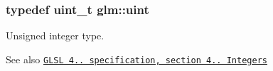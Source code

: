 \subsubsection[{uint}]{\setlength{\rightskip}{0pt plus 5cm}typedef uint\+\_\+t {\bf glm\+::uint}}\label{group__core__precision_ga483f6011e60602f0b73bfd0acad0f04c}
Unsigned integer type.

\begin{DoxySeeAlso}{See also}
\href{http://www.opengl.org/registry/doc/GLSLangSpec.4.20.8.pdf}{\tt G\+L\+S\+L 4.. specification, section 4.. Integers} 
\end{DoxySeeAlso}
